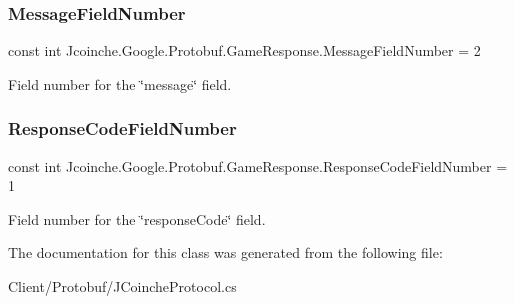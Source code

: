 \subsubsection{\texorpdfstring{Message\+Field\+Number}{MessageFieldNumber}}
{\footnotesize\ttfamily const int Jcoinche.\+Google.\+Protobuf.\+Game\+Response.\+Message\+Field\+Number = 2}



Field number for the \char`\"{}message\char`\"{} field.

\mbox{\label{class_jcoinche_1_1_google_1_1_protobuf_1_1_game_response_ae8ef09fcb2b9c7f69f0361959e9b818d}} 
\subsubsection{\texorpdfstring{Response\+Code\+Field\+Number}{ResponseCodeFieldNumber}}
{\footnotesize\ttfamily const int Jcoinche.\+Google.\+Protobuf.\+Game\+Response.\+Response\+Code\+Field\+Number = 1}



Field number for the \char`\"{}response\+Code\char`\"{} field.



The documentation for this class was generated from the following file\+:\begin{DoxyCompactItemize}
\item 
Client/\+Protobuf/J\+Coinche\+Protocol.\+cs\end{DoxyCompactItemize}
